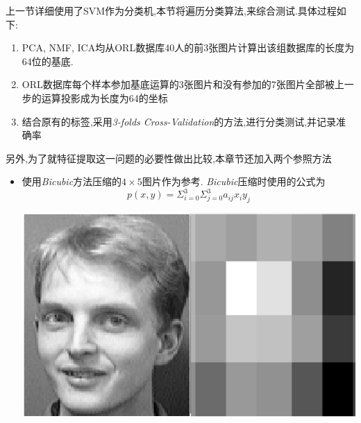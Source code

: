 上一节详细使用了SVM作为分类机,本节将遍历分类算法,来综合测试.具体过程如下:
	\begin{enumerate}
		\item PCA, NMF, ICA均从ORL数据库40人的前3张图片计算出该组数据库的长度为64位的基底.
		\item ORL数据库每个样本参加基底运算的3张图片和没有参加的7张图片全部被上一步的运算投影成为长度为64的坐标
		\item 结合原有的标签,采用\textit{3-folds Cross-Validation}的方法,进行分类测试,并记录准确率
	\end{enumerate}
另外,为了就特征提取这一问题的必要性做出比较,本章节还加入两个参照方法\begin{itemize} 
	\item 使用\textit{Bicubic}方法压缩的$4 \times 5$图片作为参考. \textit{Bicubic}压缩时使用的公式为
$$ p(x,y) = \Sigma_{i=0}^3\Sigma_{j=0}^3 a_{ij} x_i y_j $$

		\begin{center}
	\begin{minipage}[t]{\linewidth}
	\center
	{
	\includegraphics[width=\MyFactor\textwidth]{Img/peo_resize2} 
	}
	\end{minipage}
	\medskip
	\end{center}
	

\end{itemize}
